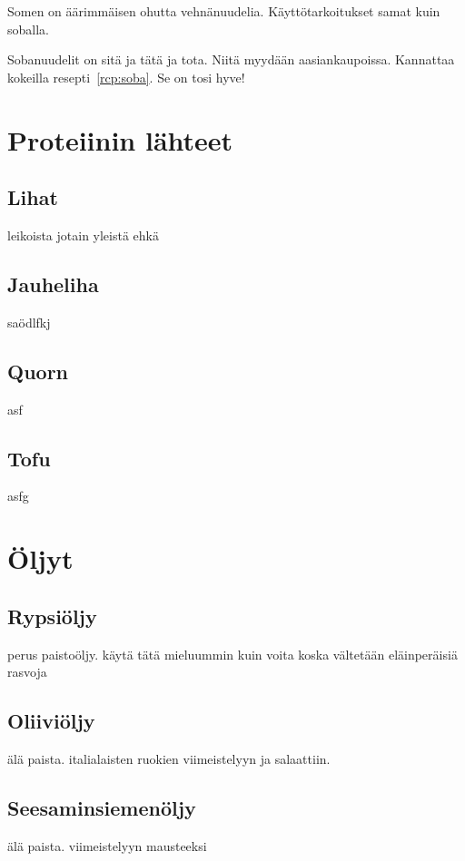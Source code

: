 \documentclass[../keittiokirja.tex]{subfiles}
\begin{document}
Somen on äärimmäisen ohutta vehnänuudelia. Käyttötarkoitukset samat kuin soballa. 

Sobanuudelit on sitä ja tätä ja tota. Niitä myydään aasiankaupoissa. 
Kannattaa kokeilla resepti~\ref{rcp:soba}. Se on tosi hyve!

\section{Proteiinin lähteet}

\subsection{Lihat}

leikoista jotain yleistä ehkä

\subsection{Jauheliha}

saödlfkj

\subsection{Quorn}

asf

\subsection{Tofu}

asfg


\section{Öljyt}

\subsection{Rypsiöljy}

perus paistoöljy. käytä tätä mieluummin kuin voita koska vältetään eläinperäisiä rasvoja

\subsection{Oliiviöljy}

älä paista. italialaisten ruokien viimeistelyyn ja salaattiin.

\subsection{Seesaminsiemenöljy}

älä paista. viimeistelyyn mausteeksi
\end{document}
